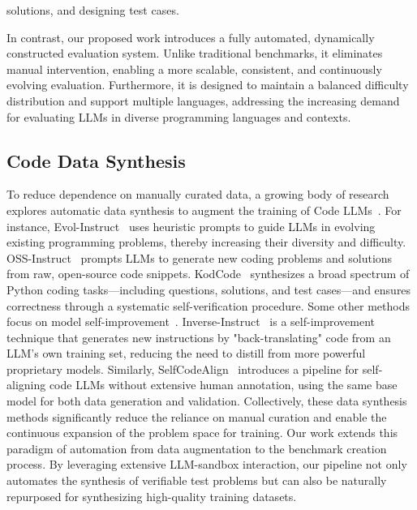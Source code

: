 solutions, and designing test cases.

In contrast, our proposed work introduces a fully automated, dynamically constructed evaluation system. Unlike traditional benchmarks, it eliminates manual intervention, enabling a more scalable, consistent, and continuously evolving evaluation. Furthermore, it is designed to maintain a balanced difficulty distribution and support multiple languages, addressing the increasing demand for evaluating LLMs in diverse programming languages and contexts.


\subsection{Code Data Synthesis}
To reduce dependence on manually curated data, a growing body of research explores automatic data synthesis to augment the training of Code LLMs~\citep{luo2024wizardcoder,magicoder,zheng-etal-2024-opencodeinterpreter,wu2024inversecoderselfimprovinginstructiontunedcode,yu2024wavecoderwidespreadversatileenhancement,ahmad2025opencodeinstructlargescaleinstructiontuning,xu2025kodcode}. For instance, Evol-Instruct~\citep{luo2024wizardcoder} uses heuristic prompts to guide LLMs in evolving existing programming problems, thereby increasing their diversity and difficulty. OSS-Instruct~\citep{magicoder} prompts LLMs to generate new coding problems and solutions from raw, open-source code snippets. KodCode~\citep{xu2025kodcode} synthesizes a broad spectrum of Python coding tasks—including questions, solutions, and test cases—and ensures correctness through a systematic self-verification procedure. Some other methods focus on model self-improvement~\citep{wu2024inversecoder,NEURIPS2024selfcodealign,chen-etal-2025-revisit,zhou2025refinecoderiterativeimprovinglarge}. Inverse-Instruct~\citep{wu2024inversecoder} is a self-improvement technique that generates new instructions by "back-translating" code from an LLM's own training set, reducing the need to distill from more powerful proprietary models. Similarly, SelfCodeAlign~\citep{NEURIPS2024selfcodealign} introduces a pipeline for self-aligning code LLMs without extensive human annotation, using the same base model for both data generation and validation. Collectively, these data synthesis methods significantly reduce the reliance on manual curation and enable the continuous expansion of the problem space for training. Our work extends this paradigm of automation from data augmentation to the benchmark creation process. By leveraging extensive LLM-sandbox interaction, our pipeline not only automates the synthesis of verifiable test problems but can also be naturally repurposed for synthesizing high-quality training datasets. 

